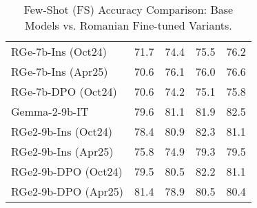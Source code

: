 \begin{table}[ht!]
\begin{tabular}{lcccc}
RGe-7b-Ins (Oct24)      & 71.7 & 74.4 & 75.5 & 76.2 \\
RGe-7b-Ins (Apr25)      & 70.6 & 76.1 & 76.0 & 76.6 \\
RGe-7b-DPO (Oct24)      & 70.6 & 74.2 & 75.1 & 75.8 \\
\midrule
Gemma-2-9b-IT           & 79.6 & 81.1 & 81.9 & 82.5 \\
RGe2-9b-Ins (Oct24)     & 78.4 & 80.9 & 82.3 & 81.1 \\
RGe2-9b-Ins (Apr25)     & 75.8 & 74.9 & 79.3 & 79.5 \\
RGe2-9b-DPO (Oct24)     & 79.5 & 80.5 & 82.2 & 81.1 \\
RGe2-9b-DPO (Apr25)     & 81.4 & 78.9 & 80.5 & 80.4 \\
\bottomrule
\end{tabular}
\caption{Few-Shot (FS) Accuracy Comparison: Base Models vs. Romanian Fine-tuned Variants.}
\label{tab:few_shot_results}
\end{table}
